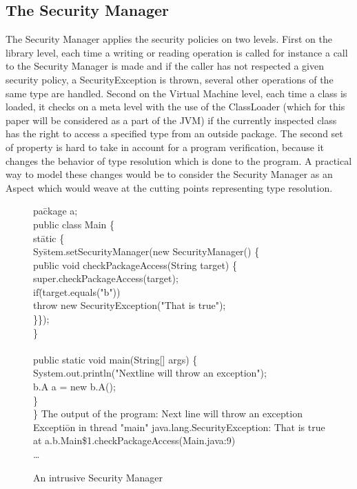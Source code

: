 \documentclass[draft]{llncs}
\begin{document}
\subsection{The Security Manager}
The Security Manager applies the security policies on two levels. First on the library level, each time a
writing or reading operation is called for instance a call to the Security Manager is made and if the
caller has not respected a given security policy, a SecurityException is thrown, several other operations
of the same type are handled. Second on the Virtual Machine level, each time a class is loaded, it checks on
a meta level with the use of the ClassLoader (which for this paper will be considered as a part of the
JVM) if the currently inspected class has the right to access a specified type from an outside package.
The second set of property is hard to take in account for a program verification, because it changes the 
behavior of type resolution which is done to the program.
A practical way to model these changes  would be to consider the Security Manager as an Aspect which
would weave at the cutting points representing type resolution.
\begin{figure}
\btab
pa\=ckage a;\\
public class Main \{\+\\
  st\=atic \{\+\\
    Sy\=stem.setSecurityManager(new SecurityManager() \{\+\\
      pu\=blic void checkPackageAccess(String target) \{\+\\
        super.checkPackageAccess(target);\\
        if\=(target.equals("b"))\\
          \>throw new SecurityException("That is true");\\
      \}\});\-\-\\
  \}\\
 \\
  public static void main(String[] args) \{\+\\
    System.out.println("Nextline will throw an exception");\\
    b.A a = new b.A();\-\\
  \}\-\\
\}
\etab
The output of the program:
\btab
Next line will throw an exception\\
Excepti\=on in thread "main" java.lang.SecurityException: That is true\+\\
	at a.b.Main\$1.checkPackageAccess(Main.java:9)\\
	\dots
\etab
\caption{An intrusive Security Manager}
\end{figure}
\end{document}
